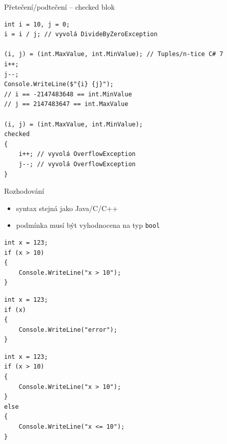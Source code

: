 \begin{frame}[fragile]
\begin{bonusblock}{Přetečení/podtečení -- checked blok}
\begin{lstlisting}
int i = 10, j = 0;
i = i / j; // vyvolá DivideByZeroException

(i, j) = (int.MaxValue, int.MinValue); // Tuples/n-tice C# 7
i++;
j--;
Console.WriteLine($"{i} {j}");
// i == -2147483648 == int.MinValue
// j == 2147483647 == int.MaxValue

(i, j) = (int.MaxValue, int.MinValue);
checked
{
    i++; // vyvolá OverflowException
    j--; // vyvolá OverflowException
}
\end{lstlisting}
\end{bonusblock}
\end{frame}





\begin{frame}[fragile]
\vfill
\begin{block}{Rozhodování}
\begin{itemize}
\item syntax stejná jako Java/C/C++
\item podmínka musí být vyhodnocena na typ \lstinline|bool|
\end{itemize}
\end{block}
\vfill
\begin{yesblock}
\begin{lstlisting}
int x = 123;
if (x > 10)
{
    Console.WriteLine("x > 10");
}
\end{lstlisting}
\end{yesblock}
\vfill
\begin{noblock}
\begin{lstlisting}
int x = 123;
if (x)
{
    Console.WriteLine("error");
}
\end{lstlisting}
\end{noblock}
\vfill
\end{frame}

\begin{frame}[fragile]
\begin{yesblock}
\begin{lstlisting}
int x = 123;
if (x > 10)
{
    Console.WriteLine("x > 10");
}
else
{
    Console.WriteLine("x <= 10");
}
\end{lstlisting}
\end{yesblock}
\end{frame}





